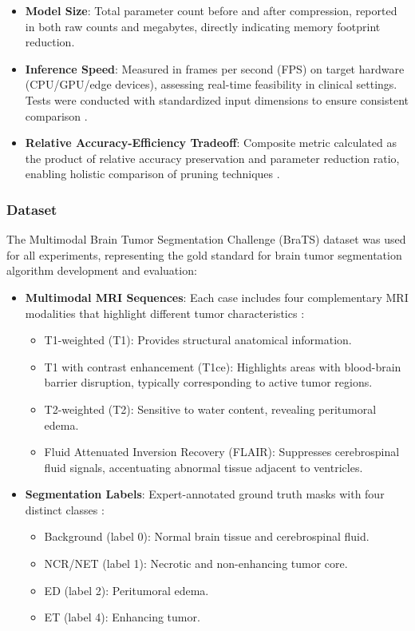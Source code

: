 \documentclass[12pt,a4paper]{article}
\begin{document}
\begin{enumerate}
\begin{itemize}
    \item \textbf{Model Size}: Total parameter count before and after compression, reported in both raw counts and megabytes, directly indicating memory footprint reduction.
    
    \item \textbf{Inference Speed}: Measured in frames per second (FPS) on target hardware (CPU/GPU/edge devices), assessing real-time feasibility in clinical settings. Tests were conducted with standardized input dimensions to ensure consistent comparison \cite{Chen2019}.
    
    \item \textbf{Relative Accuracy-Efficiency Tradeoff}: Composite metric calculated as the product of relative accuracy preservation and parameter reduction ratio, enabling holistic comparison of pruning techniques \cite{Li2023}.
\end{itemize}

\subsubsection{Dataset}
The Multimodal Brain Tumor Segmentation Challenge (BraTS) dataset was used for all experiments, representing the gold standard for brain tumor segmentation algorithm development and evaluation:

\begin{itemize}
    \item \textbf{Multimodal MRI Sequences}: Each case includes four complementary MRI modalities that highlight different tumor characteristics \cite{Bakas2017}:
    \begin{itemize}
        \item T1-weighted (T1): Provides structural anatomical information.
        \item T1 with contrast enhancement (T1ce): Highlights areas with blood-brain barrier disruption, typically corresponding to active tumor regions.
        \item T2-weighted (T2): Sensitive to water content, revealing peritumoral edema.
        \item Fluid Attenuated Inversion Recovery (FLAIR): Suppresses cerebrospinal fluid signals, accentuating abnormal tissue adjacent to ventricles.
    \end{itemize}
    
    \item \textbf{Segmentation Labels}: Expert-annotated ground truth masks with four distinct classes \cite{Menze2015}:
    \begin{itemize}
        \item Background (label 0): Normal brain tissue and cerebrospinal fluid.
        \item NCR/NET (label 1): Necrotic and non-enhancing tumor core.
        \item ED (label 2): Peritumoral edema.
        \item ET (label 4): Enhancing tumor.
    \end{itemize}
    

\end{itemize}
\end{enumerate}
\end{document}
